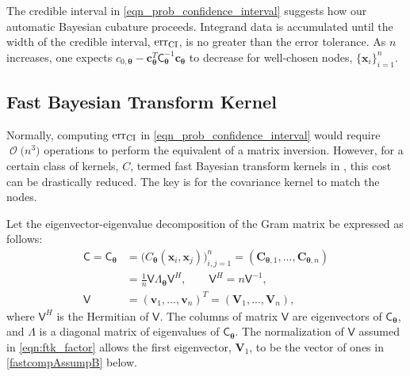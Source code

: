 \documentclass{svjour3}                     %
\DeclareMathOperator{\Order}{{\mathcal O}}
\newcommand{\bm}[1]{\boldsymbol{#1}}
\newcommand{\vtheta}{{\bm{\theta}}}
\newcommand{\vc}{\bm{c}}
\newcommand{\vC}{\bm{C}}
\newcommand{\vv}{\bm{v}}
\newcommand{\vV}{\bm{V}}
\newcommand{\vx}{\bm{x}}
\newcommand{\mC}{\mathsf{C}}
\newcommand{\mCtheta}{{\mathsf{C}_{\vtheta}}}
\newcommand{\mLambda}{\mathsf{\Lambda}}
\newcommand{\mV}{\mathsf{V}}
\newcommand{\CI}{\textup{CI}}
\newcommand{\err}{\textup{err}}
\begin{document}
The credible interval in \eqref{eqn_prob_confidence_interval} suggests how our automatic Bayesian cubature proceeds.  Integrand data is accumulated until the width of the credible interval, $\err_{\CI}$, is no greater than the error tolerance.  As $n$ increases, one expects $c_{0,\vtheta} - \vc_\vtheta^T\mC_\vtheta^{-1}\vc_\vtheta$ to decrease for well-chosen nodes, $\{\vx_i\}_{i=1}^n$. 



\subsection{Fast Bayesian Transform Kernel}
\label{sec:fast_BC}

Normally, computing $\err_{\CI}$ in  \eqref{eqn_prob_confidence_interval} would require $\Order\bigl( n^3 \bigr)$ operations to perform the equivalent of a matrix inversion.  However, for a certain class of kernels, $C$, termed fast Bayesian transform kernels in \cite{RatHic19a}, this cost can be drastically reduced.  The key is for the covariance kernel to match the nodes.

Let the eigenvector-eigenvalue decomposition of the Gram matrix be expressed as follows:
\begin{align}
\nonumber
\mC = \mCtheta &= \Big(C_\vtheta(\vx_i,\vx_j)\Big)_{i,j=1}^n  = (\vC_{\vtheta,1},...,\vC_{\vtheta,n}) 
\\
\label{eqn:ftk_factor}
&= \frac 1n \mV \mLambda_\vtheta \mV^H , 
\quad \quad \mV^H = n \mV^{-1}, \\
\nonumber
\mV &= (\vv_1,...,\vv_n)^T = (\vV_1,...,\vV_n),
\end{align}
where $\mV^H$ is the Hermitian of $\mV$.
The columns of matrix $\mV$ are eigenvectors of $\mC_\vtheta$, and $\mLambda$ is a diagonal matrix of eigenvalues of $\mC_\vtheta$. The normalization of $\mV$ assumed in \eqref{eqn:ftk_factor} allows the first eigenvector, $\vV_1$, to be the vector of ones in \eqref{fastcompAssumpB} below.
\end{document}
